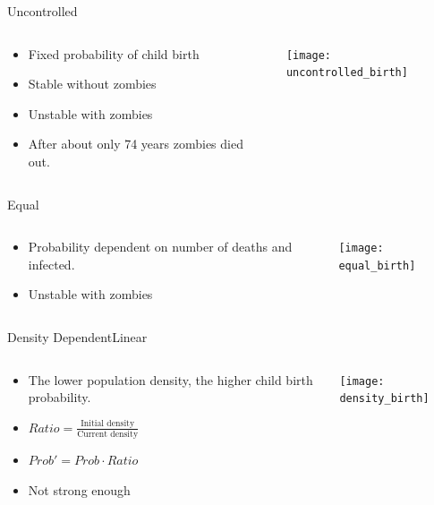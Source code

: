 \documentclass{beamer}
\begin{document}
\begin{frame}{Uncontrolled}
    \begin{columns}
        \begin{column}{0.4\textwidth}
            \begin{itemize}
                \item Fixed probability of child birth
                \item Stable without zombies
                \item Unstable with zombies
                \item After about only 74 years zombies died out.
            \end{itemize}
        \end{column}
        \begin{column}{0.6\textwidth}
            \texttt{[image: uncontrolled\_birth]}
        \end{column}
    \end{columns}
\end{frame}

\begin{frame}{Equal}
    \begin{columns}
        \begin{column}{0.4\textwidth}
            \begin{itemize}
                \item Probability dependent on number of deaths and infected.
                \item Unstable with zombies
            \end{itemize}
        \end{column}
        \begin{column}{0.6\textwidth}
            \texttt{[image: equal\_birth]}
        \end{column}
    \end{columns}
\end{frame}

\begin{frame}{Density Dependent}{Linear}
    \begin{columns}
        \begin{column}{0.4\textwidth}
            \begin{itemize}
                \item The lower population density, the higher child birth probability.
                \item $Ratio = \frac{\text{Initial density}}{\text{Current density}}$
                \item $Prob' = Prob \cdot Ratio$
                \item Not strong enough
            \end{itemize}
        \end{column}
        \begin{column}{0.6\textwidth}
            \texttt{[image: density\_birth]}
        \end{column}
    \end{columns}
\end{frame}
\end{document}
